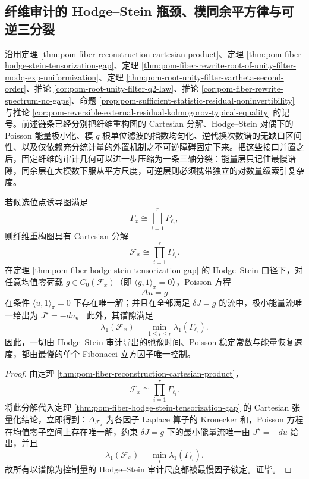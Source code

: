 \subsection{纤维审计的 Hodge--Stein 瓶颈、模同余平方律与可逆三分裂}\label{subsec:conclusion-fiber-audit-hodge-congruence-reversible-trisplitting}
沿用定理 \ref{thm:pom-fiber-reconstruction-cartesian-product}、定理 \ref{thm:pom-fiber-hodge-stein-tensorization-gap}、定理 \ref{thm:pom-fiber-rewrite-root-of-unity-filter-modq-exp-uniformization}、定理 \ref{thm:pom-root-unity-filter-vartheta-second-order}、推论 \ref{cor:pom-root-unity-filter-q2-law}、推论 \ref{cor:pom-fiber-rewrite-spectrum-no-gaps}、命题 \ref{prop:pom-sufficient-statistic-residual-noninvertibility} 与推论 \ref{cor:pom-reversible-external-residual-kolmogorov-typical-equality} 的记号。前述链条已经分别把纤维重构图的 Cartesian 分解、Hodge--Stein 对偶下的 Poisson 能量极小化、模 \(q\) 根单位滤波的指数均匀化、逆代换次数谱的无缺口区间性、以及仅依赖充分统计量的外置机制之不可逆障碍固定下来。把这些接口并置之后，固定纤维的审计几何可以进一步压缩为一条三轴分裂：能量层只记住最慢谱隙，同余层在大模数下服从平方尺度，可逆层则必须携带独立的对数量级索引复杂度。

\begin{theorem}\label{thm:conclusion-fiber-hodge-stein-bottleneck-principle}
若候选位点诱导图满足
\[
\Gamma_x\cong \bigsqcup_{i=1}^r P_{\ell_i},
\]
则纤维重构图具有 Cartesian 分解
\[
\mathcal F_x\cong \prod_{i=1}^r \Gamma_{\ell_i}.
\]
在定理 \ref{thm:pom-fiber-hodge-stein-tensorization-gap} 的 Hodge--Stein 口径下，对任意均值零荷载 \(g\in C_0(\mathcal F_x)\)（即 \(\langle g,1\rangle_\pi=0\)），Poisson 方程
\[
\Delta u=g
\]
在条件 \(\langle u,1\rangle_\pi=0\) 下存在唯一解；并且在全部满足 \(\delta J=g\) 的流中，极小能量流唯一给出为 \(J^\star=-du\)。
此外，其谱隙满足
\[
\lambda_1(\mathcal F_x)=\min_{1\le i\le r}\lambda_1(\Gamma_{\ell_i}).
\]
因此，一切由 Hodge--Stein 审计导出的弛豫时间、Poisson 稳定常数与能量恢复速度，都由最慢的单个 Fibonacci 立方因子唯一控制。
\end{theorem}
\begin{proof}
由定理 \ref{thm:pom-fiber-reconstruction-cartesian-product}，
\[
\mathcal F_x\cong \prod_{i=1}^r \Gamma_{\ell_i}.
\]
将此分解代入定理 \ref{thm:pom-fiber-hodge-stein-tensorization-gap} 的 Cartesian 张量化结论，立即得到：\(\Delta_{\mathcal F_x}\) 为各因子 Laplace 算子的 Kronecker 和，Poisson 方程在均值零子空间上存在唯一解，约束 \(\delta J=g\) 下的最小能量流唯一由 \(J^\star=-du\) 给出，并且
\[
\lambda_1(\mathcal F_x)=\min_i\lambda_1(\Gamma_{\ell_i}).
\]
故所有以谱隙为控制量的 Hodge--Stein 审计尺度都被最慢因子锁定。证毕。
\end{proof}

